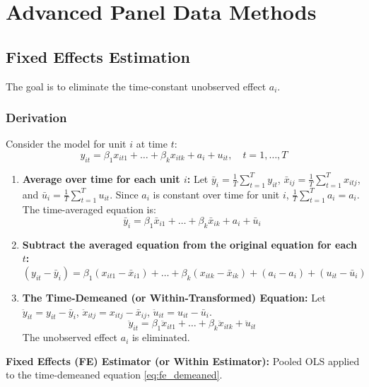 \documentclass[a4paper, 10pt]{article}
\theoremstyle{definition}	%
\begin{document}
\section{Advanced Panel Data Methods}

\subsection{Fixed Effects Estimation}
The goal is to eliminate the time-constant unobserved effect \(a_i\).

\subsubsection{Derivation}
Consider the model for unit \(i\) at time \(t\):
\begin{equation} \label{eq:fe_original}
y_{it} = \beta_1 x_{it1} + \dots + \beta_k x_{itk} + a_i + u_{it}, \quad t=1, \dots, T
\end{equation}
\begin{enumerate}
    \item \textbf{Average over time for each unit \(i\):}
    Let \(\bar{y}_i = \frac{1}{T}\sum_{t=1}^{T} y_{it}\), \(\bar{x}_{ij} = \frac{1}{T}\sum_{t=1}^{T} x_{itj}\), and \(\bar{u}_i = \frac{1}{T}\sum_{t=1}^{T} u_{it}\).
    Since \(a_i\) is constant over time for unit \(i\), \(\frac{1}{T}\sum_{t=1}^{T} a_i = a_i\).
    The time-averaged equation is:
    \begin{equation} \label{eq:fe_averaged}
    \bar{y}_i = \beta_1 \bar{x}_{i1} + \dots + \beta_k \bar{x}_{ik} + a_i + \bar{u}_i
    \end{equation}
    \item \textbf{Subtract the averaged equation from the original equation for each \(t\):}
    \((y_{it} - \bar{y}_i) = \beta_1(x_{it1} - \bar{x}_{i1}) + \dots + \beta_k(x_{itk} - \bar{x}_{ik}) + (a_i - a_i) + (u_{it} - \bar{u}_i)\)
    \item \textbf{The Time-Demeaned (or Within-Transformed) Equation:}
    Let \(\ddot{y}_{it} = y_{it} - \bar{y}_i\), \(\ddot{x}_{itj} = x_{itj} - \bar{x}_{ij}\), \(\ddot{u}_{it} = u_{it} - \bar{u}_i\).
    \begin{equation} \label{eq:fe_demeaned}
    \ddot{y}_{it} = \beta_1 \ddot{x}_{it1} + \dots + \beta_k \ddot{x}_{itk} + \ddot{u}_{it}
    \end{equation}
    The unobserved effect \(a_i\) is eliminated.
\end{enumerate}
\textbf{Fixed Effects (FE) Estimator (or Within Estimator):} Pooled OLS applied to the time-demeaned equation \eqref{eq:fe_demeaned}.
\end{document}
